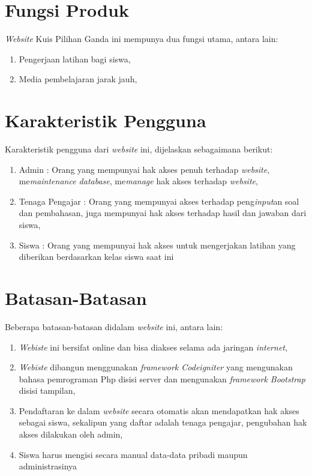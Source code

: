 \documentclass{scrreprt}
\begin{document}
\section{Fungsi Produk}
\emph{Website} Kuis Pilihan Ganda ini mempunya dua fungsi utama, antara lain:
\begin{enumerate}
	\item Pengerjaan latihan bagi siswa,
	\item Media pembelajaran jarak jauh,
\end{enumerate}

\section{Karakteristik Pengguna}
Karakteristik pengguna dari \emph{website} ini, dijelaskan sebagaimana berikut:
\begin{enumerate}
	\item Admin : Orang yang mempunyai hak akses penuh terhadap \emph{website}, me\emph{maintenance database}, me\emph{manage} hak akses terhadap \emph{website},
	\item Tenaga Pengajar : Orang yang mempunyai akses terhadap peng\emph{input}an soal dan pembahasan, juga mempunyai hak akses terhadap hasil dan jawaban dari siswa,
	\item Siswa : Orang yang mempunyai hak akses untuk mengerjakan latihan yang diberikan berdasarkan kelas siswa saat ini 
\end{enumerate}

\section{Batasan-Batasan}
Beberapa batasan-batasan didalam \emph{website} ini, antara lain:
\begin{enumerate}
	\item \emph{Webiste} ini bersifat online dan bisa diakses selama ada jaringan \emph{internet},
	\item \emph{Webiste} dibangun menggunakan \emph{framework Codeigniter} yang mengunakan bahasa pemrograman Php disisi server dan mengunakan \emph{framework Bootstrap} disisi tampilan,
	\item Pendaftaran ke dalam \emph{website} secara otomatis akan mendapatkan hak akses sebagai siswa, sekalipun yang daftar adalah tenaga pengajar, pengubahan hak akses dilakukan oleh admin,
	\item Siswa harus mengisi secara manual data-data pribadi maupun administrasinya  
\end{enumerate}
\end{document}
